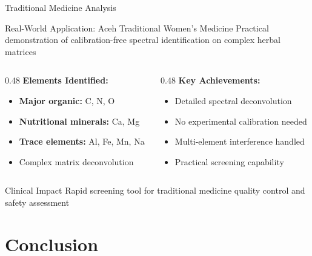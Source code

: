 \documentclass{beamer}
\begin{document}
\begin{frame}{Traditional Medicine Analysis}
  \begin{block}{Real-World Application: Aceh Traditional Women's Medicine}
    Practical demonstration of calibration-free spectral identification on complex herbal matrices
  \end{block}
  
  \begin{columns}[T]
    \begin{column}{0.48\textwidth}
      \textbf{Elements Identified:}
      \begin{itemize}
        \item \textbf{Major organic:} C, N, O
        \item \textbf{Nutritional minerals:} Ca, Mg
        \item \textbf{Trace elements:} Al, Fe, Mn, Na
        \item Complex matrix deconvolution
      \end{itemize}
    \end{column}
    \begin{column}{0.48\textwidth}
      \textbf{Key Achievements:}
      \begin{itemize}
        \item Detailed spectral deconvolution
        \item No experimental calibration needed
        \item Multi-element interference handled
        \item Practical screening capability
      \end{itemize}
    \end{column}
  \end{columns}
  
  \vspace{1em}
  \begin{exampleblock}{Clinical Impact}
    Rapid screening tool for traditional medicine quality control and safety assessment
  \end{exampleblock}
\end{frame}

\section{Conclusion}
\end{document}
